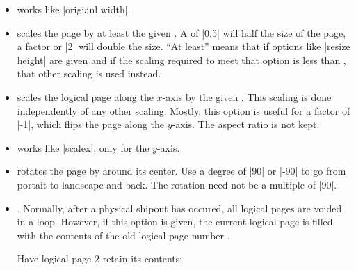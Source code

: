 \begin{command}{\pgfsetuppage{}}
\begin{itemize}
    You need this option only for special logical pages that have
    a height or width different from the normal one and for which you
    will (later on) set these sizes yourself.
  \item
    works like |origianl width|.
  \item
    scales the page by at least the given . A
     of |0.5| will half the size of the page, a factor or
    |2| will double the size. ``At least'' means that if options like
    |resize height| are given and if the scaling required to meet that
    option is less than , that other scaling is used
    instead. 
  \item
    scales the logical page along the $x$-axis by the given
    . This scaling is done independently of any other
    scaling. Mostly, this option is useful for a factor of |-1|, which
    flips the page along the $y$-axis. The aspect ratio is not kept.
  \item
    works like |scalex|, only for the $y$-axis.
  \item
    rotates the page by  around its center. Use a degree
    of |90| or |-90| to go from portait to landscape and back. The
    rotation need not be a multiple of |90|.
  \item
    .
    Normally, after a physical shipout has occured, all logical pages
    are voided in a loop. However, if this option is given, the
    current logical page is filled with the contents of the old
    logical page number .

    \example Have logical page 2 retain its contents:
\begin{codeexample}
\end{codeexample}


\end{itemize}
\end{command}
